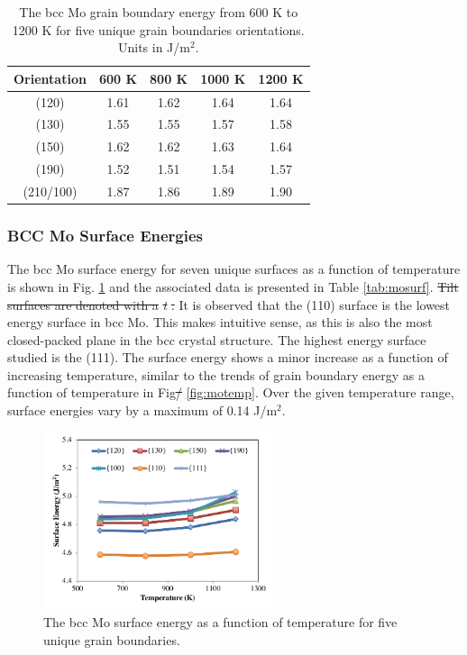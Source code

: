 \documentclass[review]{elsarticle}
\providecommand{\DIFaddtex}[1]{{\protect\color{blue}\uwave{#1}}} %
\providecommand{\DIFdeltex}[1]{{\protect\color{red}\sout{#1}}}                      %
\providecommand{\DIFaddbegin}{} %
\providecommand{\DIFaddend}{} %
\providecommand{\DIFdelbegin}{} %
\providecommand{\DIFdelend}{} %
\providecommand{\DIFadd}[1]{\texorpdfstring{\DIFaddtex{#1}}{#1}} %
\providecommand{\DIFdel}[1]{\texorpdfstring{\DIFdeltex{#1}}{}} %
\newcommand{\DIFscaledelfig}{0.5}
\newlength{\DIFdelgraphicswidth} %
\newlength{\DIFdelgraphicsheight} %
\newcommand{\DIFaddincludegraphics}[2][]{{\color{blue}\fbox{\DIFOincludegraphics[#1]{#2}}}} %
\newcommand{\DIFdelincludegraphics}[2][]{%
\sbox{\DIFdelgraphicsbox}{\DIFOincludegraphics[#1]{#2}}%
\settoboxwidth{\DIFdelgraphicswidth}{\DIFdelgraphicsbox} %
\settoboxtotalheight{\DIFdelgraphicsheight}{\DIFdelgraphicsbox} %
\scalebox{\DIFscaledelfig}{%
\parbox[b]{\DIFdelgraphicswidth}{\usebox{\DIFdelgraphicsbox}\\[-\baselineskip] \rule{\DIFdelgraphicswidth}{0em}}\llap{\resizebox{\DIFdelgraphicswidth}{\DIFdelgraphicsheight}{%
\setlength{\unitlength}{\DIFdelgraphicswidth}%
\begin{picture}(1,1)%
\thicklines\linethickness{2pt} %
{\color[rgb]{1,0,0}\put(0,0){\framebox(1,1){}}}%
{\color[rgb]{1,0,0}\put(0,0){\line( 1,1){1}}}%
{\color[rgb]{1,0,0}\put(0,1){\line(1,-1){1}}}%
\end{picture}%
}\hspace*{3pt}}} %
} %
\DeclareRobustCommand{\DIFaddbegin}{\DIFOaddbegin \let\includegraphics\DIFaddincludegraphics} %
\DeclareRobustCommand{\DIFaddend}{\DIFOaddend \let\includegraphics\DIFOincludegraphics} %
\DeclareRobustCommand{\DIFdelbegin}{\DIFOdelbegin \let\includegraphics\DIFdelincludegraphics} %
\DeclareRobustCommand{\DIFdelend}{\DIFOaddend \let\includegraphics\DIFOincludegraphics} %
\begin{document}
\FloatBarrier

\begin{table}[h]
\caption{The bcc Mo grain boundary energy from 600 K to 1200 K for five unique grain boundaries orientations. Units in J/m$^{2}$. } \label{tab:motemp}
\begin{center}
\begin{tabular}{|c|c|c|c|c|}
	\hline
	Orientation & 600 K & 800 K & 1000 K & 1200 K \\
	 \hline
	 (120) & 1.61 & 1.62 & 1.64 & 1.64 \\
	 (130) & 1.55 & 1.55 & 1.57 & 1.58 \\
	 (150) & 1.62 & 1.62 & 1.63 & 1.64 \\
	 (190) & 1.52 & 1.51 & 1.54 & 1.57 \\
	 (210/100) & 1.87 & 1.86 & 1.89 & 1.90 \\	 
	 \hline
\end{tabular}
\end{center}
\label{default}
\end{table}

\FloatBarrier

\subsubsection{BCC Mo Surface Energies}

The bcc Mo surface energy for seven unique surfaces as a function of temperature is shown in Fig. \ref{fig:mosurf} and the associated data is presented in Table \ref{tab:mosurf}. \DIFdelbegin \DIFdel{Tilt surfaces are denoted with a }\textit{\DIFdel{t}}%
\DIFdel{. }\DIFdelend It is observed that the (110) surface is the lowest energy surface in bcc Mo. This makes intuitive sense, as this is also the most closed-packed plane in the bcc crystal structure. The highest energy surface studied is the (111). The surface energy shows a minor increase as a function of increasing temperature, similar to the trends of grain boundary energy as a function of temperature in Fig\DIFdelbegin \DIFdel{/ }\DIFdelend \DIFaddbegin \DIFadd{. }\DIFaddend \ref{fig:motemp}. Over the given temperature range, surface energies vary by a maximum of 0.14 J/m$^{2}$.

\begin{figure}[h]
 \centering
 \includegraphics[width=0.6\textwidth]{mosurf.png}
 \caption{The bcc Mo surface energy as a function of temperature for five unique grain boundaries.}
 \label{fig:mosurf}
\end{figure}
\end{document}

